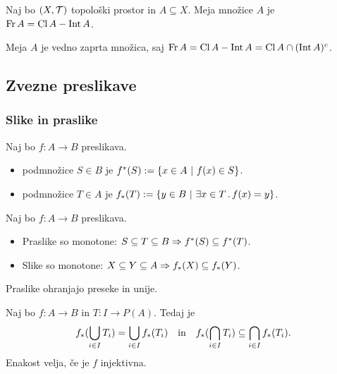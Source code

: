 \begin{trditev}
    Naj bo $(X, \mathcal{T})$ topološki prostor in $A \subseteq X$. Meja množice $A$ je $\operatorname{Fr} A = \operatorname{Cl} A - \operatorname{Int} A$.
\end{trditev}

\begin{opomba}
    Meja $A$ je vedno zaprta množica, saj $\operatorname{Fr} A = \operatorname{Cl} A - \operatorname{Int} A = \operatorname{Cl} A \cap (\operatorname{Int} A)^c$.
\end{opomba}

\subsection{Zvezne preslikave}
\subsubsection{Slike in praslike}
\begin{definicija}
    Naj bo $f: A \to B$ preslikava.
    \begin{itemize}
        \item {} podmnožice $S \in B$ je $f^*(S) := \left\{x \in A \ | \ f(x) \in S\right\}$.
        \item {} podmnožice $T \in A$ je $f_*(T) := \left\{y \in B \ | \ \exists x \in T \,.\, f(x) = y\right\}$.
    \end{itemize}
\end{definicija}

\begin{trditev}
    Naj bo $f: A \to B$ preslikava.
    \begin{itemize}
        \item Praslike so monotone: $S \subseteq T \subseteq B \Rightarrow f^{*}(S) \subseteq f^{*}(T)$.
        \item Slike so monotone: $X \subseteq Y \subseteq A \Rightarrow f_{*}(X) \subseteq f_{*}(Y)$.
    \end{itemize}
\end{trditev}

\begin{trditev}
    Praslike ohranjajo preseke in unije.
\end{trditev}

\begin{trditev}
    Naj bo $f: A \to B$ in $T: I \to P(A)$. Tedaj je
    $$f_{*}(\bigcup_{i \in I} T_i) = \bigcup_{i \in I} f_{*}(T_i) \quad \text{in} \quad f_{*}(\bigcap_{i \in I} T_i) \subseteq \bigcap_{i \in I} f_{*}(T_i).$$
    Enakost velja, če je $f$ injektivna.
\end{trditev}

